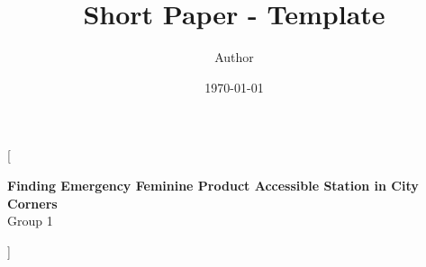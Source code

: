 \documentclass{article}
\title{Short Paper - Template}
\author{Author}
\date{\today}
\begin{document}
\twocolumn
[{
                        \LARGE
                        \textcolor{titleColor}{\textbf{Finding Emergency Feminine Product Accessible
                                        Station in City Corners}}\vspace{1ex}\\
                        \large
                        \textcolor{authorColor}{Group 1}
                        \vspace{1ex}
                        \normalsize
                        \begin{tcolorbox}[  colback = abstractColor,
                                        ,
                                        width=\linewidth,
                                        arc=1mm, auto outer arc,
                                ]
                                \justifying
                                
                        \end{tcolorbox}
                        \vspace{1.5ex}
                }]


\nocite{*}





\newpage

\onecolumn


%     
\end{document}

